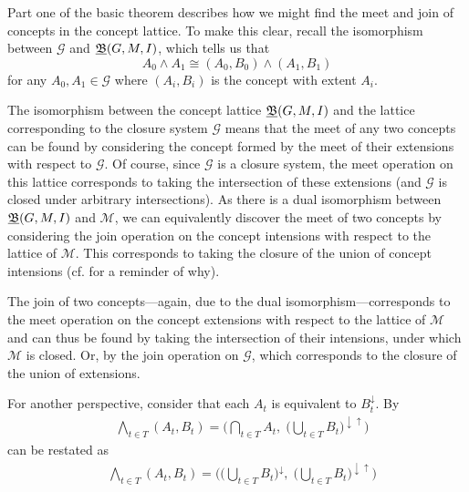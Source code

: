 Part one of the basic theorem describes how we might find the meet and join of concepts in the concept lattice. To make
this clear, recall the isomorphism between $\mathcal{G}$ and $\underline{{\mathfrak B}} (G,M,\mathrel{I})$, which tells us that
\[
	A_{0}\wedge A_{1}\cong (A_{0},B_{0}) \wedge (A_{1},B_{1})
\]
for any $A_{0},A_{1}\in \mathcal{G}$ where $(A_{i},B_{i})$ is the concept with extent $A_{i}$.

The isomorphism between the concept lattice $\underline{{\mathfrak B}} (G,M,\mathrel{I})$ and the lattice corresponding to the closure system $\mathcal{G}$
means that the meet of any two concepts can be found by considering the concept formed by the meet of their extensions
with respect to $\mathcal{G}$. Of course, since $\mathcal{G}$ is a closure system, the meet operation on this lattice corresponds
to taking the intersection of these extensions (and $\mathcal{G}$ is closed under arbitrary intersections). As there is
a dual isomorphism between $\underline{{\mathfrak B}} (G,M,\mathrel{I})$ and $\mathcal{M}$, we can equivalently discover the meet of two concepts by considering
the join operation on the concept intensions with respect to the lattice of $\mathcal{M}$. This corresponds to taking
the closure of the union of concept intensions (cf.  for a reminder of why).

The join of two concepts---again, due to the dual isomorphism---corresponds to the meet operation on the concept
extensions with respect to the lattice of $\mathcal{M}$ and can thus be found by taking the intersection of their
intensions, under which $\mathcal{M}$ is closed. Or, by the join operation on $\mathcal{G}$, which corresponds to the
closure of the union of extensions.

For another perspective, consider that each $A_{t}$ is equivalent to $B_{t}^{\downarrow}$. By
\begin{align*}
	 & \underset{t \in T}\bigwedge (A_{t}, B_{t}) = \Big( \underset{t \in T}\bigcap A_{t}, \; \big(\underset{t \in T}\bigcup B_{t}\big)^{\downarrow \uparrow}\Big)
\end{align*}
can be restated as
\begin{align*}
	 & \underset{t \in T}\bigwedge (A_{t}, B_{t}) = \Big(\big(\underset{t \in T}\bigcup B_{t}\big)^{\downarrow}, \; \big(\underset{t \in T}\bigcup B_{t}\big)^{\downarrow \uparrow}\Big)
\end{align*}

